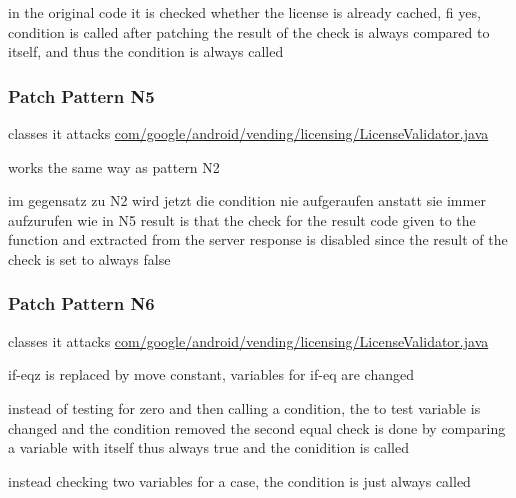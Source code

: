 in the original code it is checked whether the license is already cached, fi yes, condition is called
after patching the result of the check is always compared to itself, and thus  the condition is always called
\subsubsection{Patch Pattern N5}
classes it attacks %
\url{com/google/android/vending/licensing/LicenseValidator.java}

works the same way as pattern N2

im gegensatz zu N2 wird jetzt die condition nie aufgeraufen anstatt sie immer aufzurufen wie in N5
result is that the check for the result code given to the function and extracted from the server response is disabled since the result of the check is set to always false
\subsubsection{Patch Pattern N6}
classes it attacks %
\url{com/google/android/vending/licensing/LicenseValidator.java}



if-eqz is replaced by move constant, variables for if-eq are changed



instead of testing for zero and then calling a condition, the to test variable is changed and the condition removed
the second equal check is done by comparing a variable with itself thus always true and the conidition is called



instead checking two variables for a case, the condition is just always called
